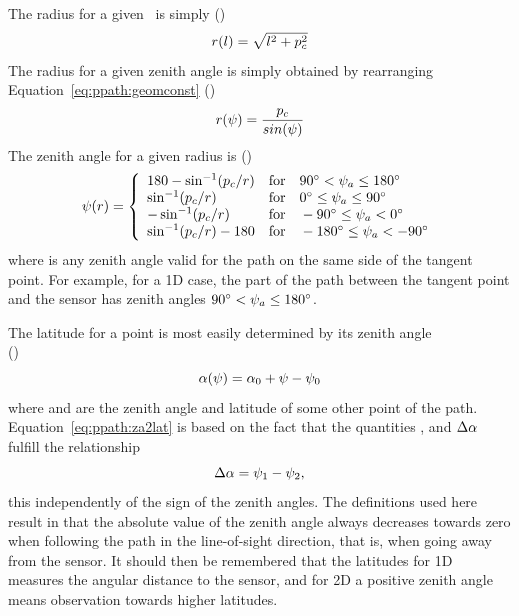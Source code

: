 The radius for a given \PpathLng\ is simply ()
\begin{equation}
  r(l) = \sqrt{l^2+p_c^2} 
  \label{eq:ppath:l2r}
\end{equation}
The radius for a given zenith angle is simply obtained by rearranging 
Equation~\ref{eq:ppath:geomconst} ()
\begin{equation}
  r(\psi) = \frac{p_c}{sin(\psi)}
  \label{eq:ppath:za2r}
\end{equation}
The zenith angle for a given radius is ()
\begin{equation}
  \psi(r) = \left\{
   \begin{array}{ll}
    180 - \sin^{-1}(p_c/r) & 
                   \textrm{for}\quad 90^\circ < \psi_{a} \leq 180^\circ\\
    \sin^{-1}(p_c/r) & 
                   \textrm{for}\quad 0^\circ \leq \psi_{a} \leq 90^\circ\\
    -\sin^{-1}(p_c/r) & 
                   \textrm{for}\quad -90^\circ \leq \psi_{a} < 0^\circ\\
    \sin^{-1}(p_c/r) - 180 & 
                  \textrm{for}\quad -180^\circ \leq \psi_{a} < -90^\circ\\
   \end{array}   \right.
  \label{eq:ppath:r2psi}
\end{equation}
where  is any zenith angle valid for the path on the same
side of the tangent point. For example, for a 1D case, the part of the
path between the tangent point and the sensor has zenith angles
$90^\circ < \psi_{a} \leq 180^\circ$.

The latitude for a point is most easily determined by its zenith angle \\
()
\begin{equation}
  \alpha(\psi) = \alpha_{0} + \psi - \psi_{0} 
  \label{eq:ppath:za2lat}
\end{equation}
where  and  are the zenith angle and latitude of some 
other point of the path. Equation~\ref{eq:ppath:za2lat} is based on the 
fact that the quantities ,  and $\Delta\alpha$
fulfill the relationship
\begin{equation}
  \Delta\alpha = \psi_{1} - \psi_{2},
  \label{eq:ppath:dlat}
\end{equation}
this independently of the sign of the zenith angles. The definitions
used here result in that the absolute value of the zenith angle always
decreases towards zero when following the path in the line-of-sight
direction, that is, when going away from the sensor. It should then be
remembered that the latitudes for 1D measures the angular distance to
the sensor, and for 2D a positive zenith angle means observation
towards higher latitudes.

